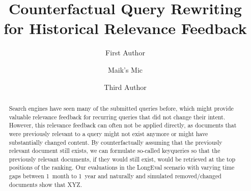 \title{Counterfactual Query Rewriting \\ for Historical Relevance Feedback}


\author{First Author \and
Maik's Mic \and
Third Author}
%
%
%
\maketitle              %
%
\begin{abstract}
Search engines have seen many of the submitted queries before, which might provide valuable relevance feedback for recurring queries that did not change their intent. However, this relevance feedback can often not be applied directly, as documents that were previously relevant to a query might not exist anymore or might have substantially changed content. By counterfactually assuming that the previously relevant document still exists, we can formulate so-called keyqueries so that the previously relevant documents, if they would still exist, would be retrieved at the top positions of the ranking. Our evaluations in the LongEval scenario with varying time gaps between 1~month to 1~year and naturally and simulated removed/changed documents show that XYZ.

\end{abstract}
